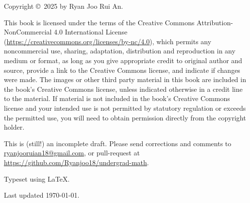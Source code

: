 \vfill

Copyright \copyright \ 2025 by Ryan Joo Rui An.

This book is licensed under the terms of the Creative Commons Attribution-NonCommercial 4.0 International License (\url{https://creativecommons.org/licenses/by-nc/4.0}), which permits any noncommercial use, sharing, adaptation, distribution and reproduction in any medium or format, as long as you give appropriate credit to original author and source, provide a link to the Creative Commons license, and indicate if changes were made. The images or other third party material in this book are included in the book's Creative Commons license, unless indicated otherwise in a credit line to the material. If material is not included in the book's Creative Commons license and your intended use is not permitted by statutory regulation or exceeds the permitted use, you will need to obtain permission directly from the copyright holder.

This is (still!) an incomplete draft. Please send corrections and comments to \url{ryanjooruian18@gmail.com}, or pull-request at \url{https://github.com/Ryanjoo18/undergrad-math}.

Typeset using \LaTeX.

Last updated \today.
\pagebreak

